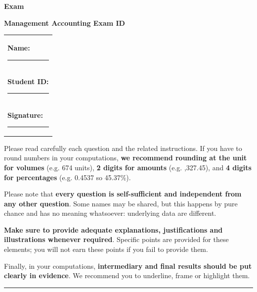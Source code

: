 \documentclass[10pt,a4paper]{article}
\makeatletter
\newcommand{\myID}{\@ID}
\newcommand{\myDate}{\@Date}
\makeatother
\begin{document}
\thispagestyle{empty}
{\rm
\textbf{\LARGE{Exam}}

\textbf{\large{Management Accounting \myDate \hfill Exam ID \myID}}

\vspace*{2cm}

\begin{tabular}{p{14cm}}
\textbf{Name:} \hrule \\[1.5cm]
\textbf{Student ID:} \hrule \\[1.5cm]
\textbf{Signature:} \hrule  \\[1.5cm]
\end{tabular}

\vspace*{1cm}

}
\newpage

Please read carefully each question and the related instructions. If you have to round numbers in your computations, \textbf{we recommend rounding at the unit for volumes} (e.g. 674 units), \textbf{2 digits for amounts} (e.g. ,327.45), and \textbf{4 digits for percentages} (e.g. 0.4537 so 45.37\%). \newline

Please note that \textbf{every question is self-sufficient and independent from any other question}. Some names may be shared, but this happens by pure chance and has no meaning whatsoever: underlying data are different. \newline

\textbf{Make sure to provide adequate explanations, justifications and illustrations whenever required}. Specific points are provided for these elements; you will not earn these points if you fail to provide them. \newline

Finally, in your computations, \textbf{intermediary and final results should be put clearly in evidence}. We recommend you to underline, frame or highlight them.  

\vspace*{0.5cm}

\hfil\rule{5cm}{.4pt}\hfil

\vspace*{0.5cm}

\begin{enumerate}


\end{enumerate}
\end{document}
